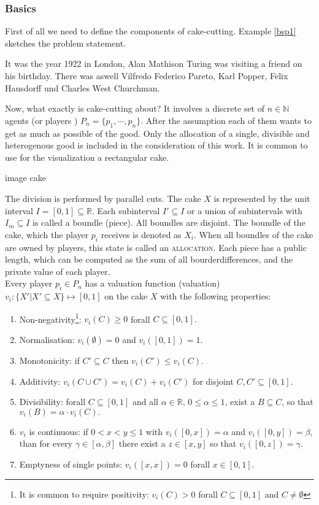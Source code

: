 \subsubsection{Basics}
First of all we need to define the components of cake-cutting. Example \ref{bsp1} sketches the problem statement.\\
%
\begin{bsp}
\label{bsp1}
It was the year 1922 in London, Alan Mathison Turing was visiting a friend on his birthday. There was aswell Vilfredo Federico Pareto, Karl Popper, Felix Hausdorff und Charles West Churchman.
\end{bsp}
%
Now, what exactly is cake-cutting about? It involves a discrete set of $n \in \mathbb{N}$ agents (or players ) $P_n=\{p_1,\cdots,p_n\}$. After the assumption each of them wants to get as much as possible of the good. Only the allocation of a single, divisible and heterogenous good is included in the consideration of this work. It is common to use for the visualization a rectangular cake.
\begin{center}
image cake
\end{center}
The division is performed by parallel cuts. The cake $X$ is represented by the unit interval $I=[0,1] \subseteq \mathbb{R}$. Each subinterval $I'\subseteq I$ or a union of subintervals %
with $I_m\subseteq I$ is called a boundle (piece). All boundles are disjoint. The boundle of the cake, which the player $p_i$ receives is denoted as $X_i$. When all boundles of the cake are owned by players, this state is called an \textsc{allocation}. Each piece has a public length, which can be computed as the sum of all bourderdifferences, and the private value of each player.\\

Every player $p_i\in P_n$ has a valuation function (valuation) $v_i:\{X'|X' \subseteq X\} \mapsto [0,1]$ on the cake $X$ with the following properties:\\
\begin{enumerate}
\item Non-negativity\footnote{It is common to require positivity: $v_i(C)>0$ forall $C\subseteq [0,1]$ and $C \neq \emptyset$}: $v_i(C)\geq 0$ forall $C\subseteq [0,1].$
\item Normalisation: $v_i(\emptyset)=0$ and $v_i([0,1])=1.$
\item Monotonicity: if $C' \subseteq C$ then $v_i(C') \leq v_i(C).$
\item Additivity: $v_i(C \cup C')=v_i(C)+v_i(C')$ for disjoint
$C,C'\subseteq [0,1].$
\item Divisibility: forall $C\subseteq [0,1]$ and all $\alpha \in
\mathbb{R}$, $0\leq \alpha \leq 1$, exist a $B\subseteq C$, so that
$v_i(B)=\alpha \cdot v_i(C).$
\item  $v_i$ is continuous: if $0<x<y\leq 1$ with $v_i([0,x])=\alpha$ and
$v_i([0,y])=\beta$, than for every $\gamma \in [\alpha,\beta]$ there exist a $z \in [x,y]$ so that $v_i([0,z])=\gamma.$
\item Emptyness of single points:  $v_i([x,x])=0$ forall $x\in [0,1].$
\end{enumerate}

